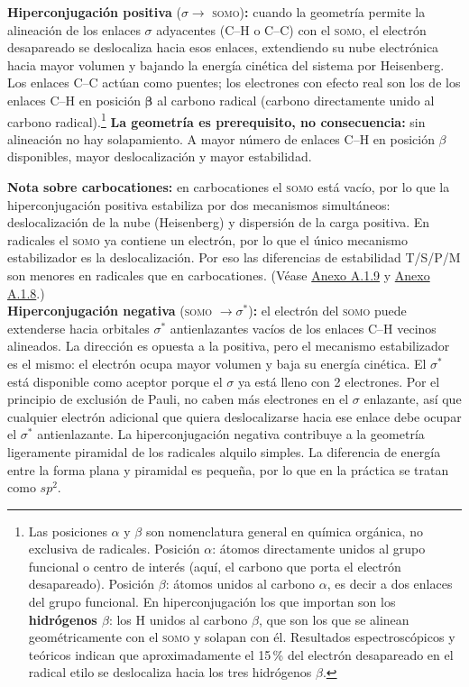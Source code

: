 \textbf{Hiperconjugación positiva} ($\sigma \rightarrow$ \textsc{somo})\textbf{:} cuando la
geometría permite la alineación de los enlaces $\sigma$ adyacentes (C--H o C--C) con el
\textsc{somo}, el electrón desapareado se deslocaliza hacia esos enlaces, extendiendo su nube
electrónica hacia mayor volumen y bajando la energía cinética del sistema por Heisenberg. Los
enlaces C--C actúan como puentes; los electrones con efecto real son los de los enlaces C--H en
posición $\boldsymbol{\beta}$ al carbono radical (carbono directamente unido al carbono
radical).\footnote{Las posiciones $\alpha$ y $\beta$ son nomenclatura general en química orgánica, no
exclusiva de radicales. Posición $\alpha$: átomos directamente unidos al grupo funcional o centro
de interés (aquí, el carbono que porta el electrón desapareado). Posición $\beta$: átomos unidos
al carbono $\alpha$, es decir a dos enlaces del grupo funcional. En hiperconjugación los que
importan son los \textbf{hidrógenos $\beta$}: los H unidos al carbono $\beta$, que son los que se
alinean geométricamente con el \textsc{somo} y solapan con él. Resultados espectroscópicos y
teóricos indican que aproximadamente el 15\,\% del electrón desapareado en el radical etilo se
deslocaliza hacia los tres hidrógenos $\beta$.} \textbf{La geometría es prerequisito, no consecuencia:} sin alineación
no hay solapamiento. A mayor número de enlaces C--H en posición $\beta$ disponibles, mayor
deslocalización y mayor estabilidad.

\textbf{Nota sobre carbocationes:} en carbocationes el \textsc{somo} está vacío, por lo que la
hiperconjugación positiva estabiliza por dos mecanismos simultáneos: deslocalización de la nube
(Heisenberg) y dispersión de la carga positiva. En radicales el \textsc{somo} ya contiene un
electrón, por lo que el único mecanismo estabilizador es la deslocalización. Por eso las diferencias
de estabilidad T/S/P/M son menores en radicales que en carbocationes. 
(Véase \hyperref[sec:anexo:tom:somo]{Anexo A.1.9} y \hyperref[sec:anexo:tom:heisenberg]{Anexo A.1.8}.)\\

\textbf{Hiperconjugación negativa} (\textsc{somo} $\rightarrow \sigma^*$)\textbf{:} el electrón
del \textsc{somo} puede extenderse hacia orbitales $\sigma^*$ antienlazantes vacíos de los enlaces
C--H vecinos alineados. La dirección es opuesta a la positiva, pero el mecanismo estabilizador es
el mismo: el electrón ocupa mayor volumen y baja su energía cinética. El $\sigma^*$ está disponible como aceptor porque el $\sigma$ ya está lleno con 
2 electrones. Por el principio de exclusión de Pauli, no caben más electrones en el 
$\sigma$ enlazante, así que cualquier electrón adicional que quiera deslocalizarse 
hacia ese enlace debe ocupar el $\sigma^*$ antienlazante. La hiperconjugación negativa contribuye a la
geometría ligeramente piramidal de los radicales alquilo simples.\supercite{breton2026}
La diferencia de energía entre la forma plana y piramidal es pequeña, por lo que en la práctica se
tratan como $sp^2$. \\

